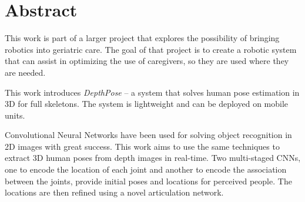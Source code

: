 \chapter*{Abstract}


This work is part of a larger project that explores the possibility of bringing robotics into geriatric care. The goal of that project is to create a robotic system that can assist in optimizing the use of caregivers, so they are used where they are needed.

This work introduces \emph{DepthPose} -- a system that solves human pose estimation in 3D for full skeletons. The system is lightweight and can be deployed on mobile units.

Convolutional Neural Networks have been used for solving object recognition in 2D images with great success. This work aims to use the same techniques to extract 3D human poses from depth images in real-time. Two multi-staged CNNs, one to encode the location of each joint and another to encode the association between the joints, provide initial poses and locations for perceived people. The locations are then refined using a novel articulation network.






